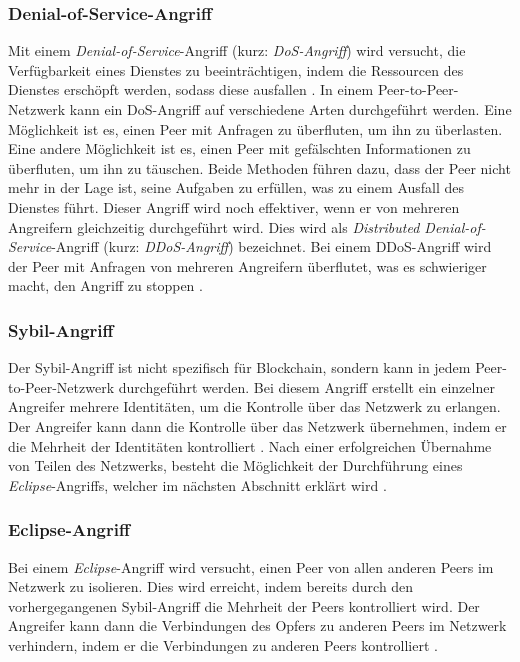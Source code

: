 \subsubsection{Denial-of-Service-Angriff}

Mit einem \textit{Denial-of-Service}-Angriff (kurz: \textit{DoS-Angriff}) wird versucht, die Verfügbarkeit eines Dienstes zu beeinträchtigen, indem die Ressourcen des Dienstes erschöpft werden, sodass diese ausfallen \parencite{Bicakci_DoSAttacks}. In einem Peer-to-Peer-Netzwerk kann ein DoS-Angriff auf verschiedene Arten durchgeführt werden. Eine Möglichkeit ist es, einen Peer mit Anfragen zu überfluten, um ihn zu überlasten. Eine andere Möglichkeit ist es, einen Peer mit gefälschten Informationen zu überfluten, um ihn zu täuschen. Beide Methoden führen dazu, dass der Peer nicht mehr in der Lage ist, seine Aufgaben zu erfüllen, was zu einem Ausfall des Dienstes führt. Dieser Angriff wird noch effektiver, wenn er von mehreren Angreifern gleichzeitig durchgeführt wird. Dies wird als \textit{Distributed Denial-of-Service}-Angriff (kurz: \textit{DDoS-Angriff}) bezeichnet. Bei einem DDoS-Angriff wird der Peer mit Anfragen von mehreren Angreifern überflutet, was es schwieriger macht, den Angriff zu stoppen \Parencite[S. 6]{Baptiste_AttacksOnP2PNetworks}.


\subsubsection{Sybil-Angriff}
\label{subsubsec:sybil_attack_p2p}

Der Sybil-Angriff ist nicht spezifisch für Blockchain, sondern kann in jedem Peer-to-Peer-Netzwerk durchgeführt werden. Bei diesem Angriff erstellt ein einzelner Angreifer mehrere Identitäten, um die Kontrolle über das Netzwerk zu erlangen. Der Angreifer kann dann die Kontrolle über das Netzwerk übernehmen, indem er die Mehrheit der Identitäten kontrolliert \parencite[S. 251]{Douceur_SybilAttack}. Nach einer erfolgreichen Übernahme von Teilen des Netzwerks, besteht die Möglichkeit der Durchführung eines \textit{Eclipse}-Angriffs, welcher im nächsten Abschnitt erklärt wird \parencite[S. 13-15]{Baptiste_AttacksOnP2PNetworks}.


\subsubsection{Eclipse-Angriff}
\label{subsubsec:eclipse_attack_p2p}

Bei einem \textit{Eclipse}-Angriff wird versucht, einen Peer von allen anderen Peers im Netzwerk zu isolieren. Dies wird erreicht, indem bereits durch den vorhergegangenen Sybil-Angriff die Mehrheit der Peers kontrolliert wird. Der Angreifer kann dann die Verbindungen des Opfers zu anderen Peers im Netzwerk verhindern, indem er die Verbindungen zu anderen Peers kontrolliert \Parencite[S. 14]{Baptiste_AttacksOnP2PNetworks}. 

